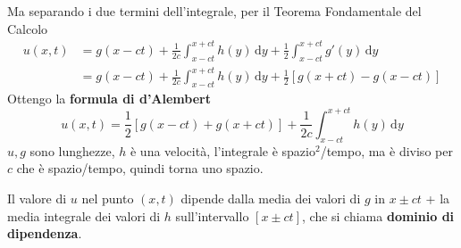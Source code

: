 \documentclass[10pt,a4paper,twoside,openright]{book}
\newcommand{\de}{\,\mathrm d}
\newcommand{\dy}{\de y}
\begin{document}
Ma separando i due termini dell'integrale, per il Teorema Fondamentale del Calcolo
\begin{align*}
    u(x,t) & =g(x-ct) +\frac{1}{2c}\int ^{x+ct}_{x-ct} h(y) \dy+\frac{1}{2}\int ^{x+ct}_{x-ct} g'(y) \dy \\
           & =g(x-ct) +\frac{1}{2c}\int ^{x+ct}_{x-ct} h(y) \dy+\frac{1}{2}[ g(x+ct) -g(x-ct)]
\end{align*}
Ottengo la \textbf{formula di d'Alembert}
\begin{equation}
    \boxed{u(x,t) =\frac{1}{2}[ g(x-ct) +g(x+ct)] +\frac{1}{2c}\int ^{x+ct}_{x-ct} h(y) \dy}
\end{equation}
$u,g$ sono lunghezze, $h$ è una velocità, l'integrale è spazio$^{2}$/tempo, ma è diviso per $c$ che è spazio/tempo, quindi torna uno spazio.

Il valore di $u$ nel punto $(x,t)$ dipende dalla media dei valori di $g$ in $x\pm ct$ + la media integrale dei valori di $h$ sull'intervallo $[ x\pm ct]$, che si chiama \textbf{dominio di dipendenza}.
\end{document}
